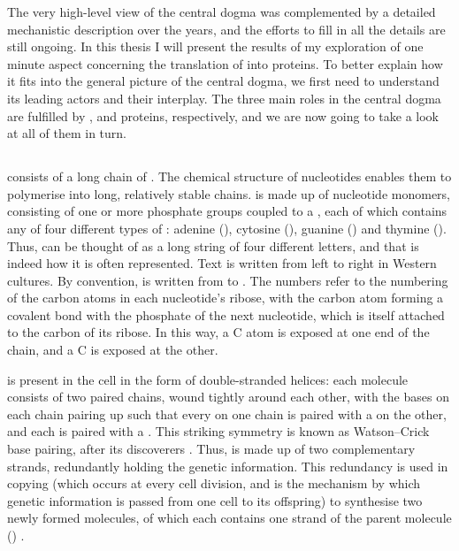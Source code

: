 The very high-level view of the central dogma was complemented by a detailed
mechanistic description over the years, and the efforts to fill in all the
details are still ongoing. In this thesis I will present the results of my
exploration of one minute aspect concerning the translation of \rna into
proteins. To better explain how it fits into the general picture of the central
dogma, we first need to understand its leading actors and their interplay. The
three main roles in the central dogma are fulfilled by \dna, \rna and proteins,
respectively, and we are now going to take a look at all of them in turn.

\subsection{}

\dna consists of a long chain of .
The chemical structure of nucleotides enables them to polymerise into long,
relatively stable chains. \dna is made up of nucleotide monomers, consisting of
one or more phosphate groups coupled to a , each of which contains any of four
different types of : adenine (\nA), cytosine (\nC), guanine
(\nG) and thymine (\nT). Thus, \dna can be thought of as a long string of four
different letters, and that is indeed how it is often represented. Text is
written from left to right in Western cultures. By convention, \dna is written
from \fivep to \threep. The numbers refer to the numbering of the carbon atoms
in each nucleotide’s ribose, with the \threep carbon atom forming a covalent
bond with the phosphate of the next nucleotide, which is itself attached to the
\fivep carbon of its ribose. In this way, a \fivep \ce C atom is exposed at one
end of the chain, and a \threep \ce C is exposed at the other.

\dna is present in the cell in the form of double-stranded helices: each \dna
molecule consists of two paired chains, wound tightly around each other, with
the bases on each chain pairing up such that every \nA on one chain is paired
with a \nT on the other, and each \nC is paired with a \nG. This striking
symmetry is known as Watson–Crick base pairing, after its discoverers
\citep{Watson:1953}. Thus, \dna is made up of two complementary strands,
redundantly holding the genetic information. This redundancy is used in \dna
copying (which occurs at every cell division, and is the mechanism by which
genetic information is passed from one cell to its offspring) to synthesise two
newly formed \dna molecules, of which each contains one strand of the parent
\dna molecule () \citep{Meselson:1958}.

